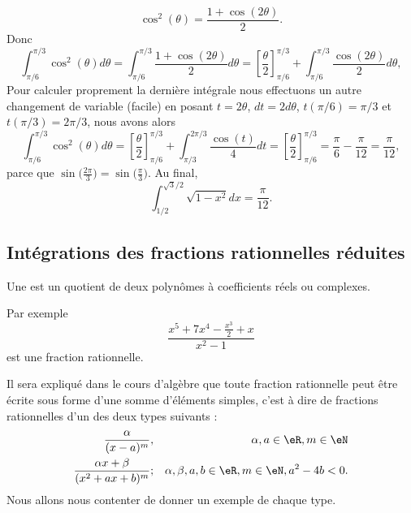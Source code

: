 \begin{example}
\begin{equation}
        \cos^2(\theta)=\frac{ 1+\cos(2\theta) }{ 2 }.
    \end{equation}
    Donc
    \begin{equation}
        \int_{\pi/6}^{\pi/3}\cos^2(\theta)d\theta=\int_{\pi/6}^{\pi/3}\frac{ 1+\cos(2\theta) }{2}d\theta=\left[ \frac{ \theta }{2}\right]_{\pi/6}^{\pi/3}+\int_{\pi/6}^{\pi/3}\frac{ \cos(2\theta) }{2}d\theta, 
    \end{equation}
    Pour calculer proprement la dernière intégrale nous effectuons un autre changement de variable (facile) en posant $t = 2\theta$, $dt = 2 d\theta$, $t(\pi/6) = \pi/3$ et $t(\pi/3) = 2\pi/3$, nous avons alors 
    \begin{equation}
        \int_{\pi/6}^{\pi/3}\cos^2(\theta)d\theta=\left[ \frac{ \theta }{2}\right]_{\pi/6}^{\pi/3}+\int_{\pi/3}^{2\pi/3}\frac{ \cos(t) }{4}dt  = \left[ \frac{ \theta }{2}\right]_{\pi/6}^{\pi/3}=\frac{ \pi }{ 6 }-\frac{ \pi }{ 12 }=\frac{ \pi }{ 12 }, 
    \end{equation}
    parce que \( \sin\big( \frac{ 2\pi }{ 3 } \big)=\sin\big( \frac{ \pi }{ 3 } \big)\). Au final,
    \begin{equation}
        \int_{1/2}^{\sqrt{3}/2}\sqrt{1-x^2}dx=\frac{ \pi }{ 12 }.
    \end{equation}
\end{example}

\subsection{Intégrations des fractions rationnelles réduites}

\begin{definition}
    Une  est un quotient de deux polynômes à coefficients réels ou complexes.
\end{definition}
Par exemple
\begin{equation}
    \frac{ x^5+7x^4-\frac{ x^3 }{2}+x }{ x^2-1 }
\end{equation}
est une fraction rationnelle.

Il sera expliqué dans le cours d'algèbre que toute fraction rationnelle peut être écrite sous forme d'une somme d'éléments simples, c'est à dire de fractions rationnelles d'un des deux types suivants :
\begin{subequations}
    \begin{align}
        \frac{ \alpha }{ (x-a)^m },&& \alpha,a\in \eR,m\in \eN  \label{CasMMIooZnZpUWi}\\
        \frac{ \alpha x+\beta }{ (x^2+ax+b)^m };&&\alpha, \beta ,a,b\in \eR,m\in \eN,a^2-4b<0. \label{CasMMIooZnZpUWii}
    \end{align}
\end{subequations}
Nous allons nous contenter de donner un exemple de chaque type.

